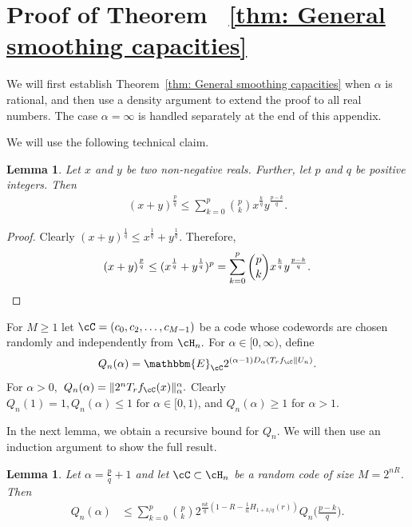 \documentclass{amsart}
\newtheorem{lemma}[theorem]{Lemma}
\theoremstyle{remark}
\begin{document}
\vspace*{.1in}\section{Proof of Theorem ~\ref{thm: General smoothing capacities}}\label{appendixB}

We will first establish Theorem~\ref{thm: General smoothing capacities} when  $\alpha$ is rational, and then use a density argument to extend the proof to all real numbers. The case $\alpha= \infty$ is handled separately at the end of this appendix.

We will use the following technical claim.

\begin{lemma}\label{lemma: frac binom.}
    Let $x$ and $y$ be two non-negative reals. Further, let $p$ and $q$ be positive integers. Then 
    \begin{align*}
        (x+y)^\frac{p}{q} \leq \sum_{k=0}^p\binom{p}{k}x^\frac{k}{q}y^\frac{p-k}{q}.
    \end{align*}
\end{lemma}
\begin{proof}
    Clearly $(x+y)^\frac{1}{q} \leq x^\frac{1}{q}+y^\frac{1}{q}$. Therefore,
    $$
        (x+y)^\frac{p}{q} \leq ( x^\frac{1}{q}+y^\frac{1}{q})^p= \sum_{k=0}^p\binom{p}{k}x^\frac{k}{q}y^\frac{p-k}{q}.\qedhere
    $$
\end{proof}
For $M\ge 1$ let $\cC = (c_0,c_2,\dots,c_{M-1})$ be a code whose codewords are chosen randomly and independently from $\cH_n.$ For $\alpha \in [0,\infty)$, define 
   \begin{equation}\label{eq:Q}
   Q_n(\alpha) = %
   \mathbbm{E}_{\cC}2^{(\alpha-1)D_{\alpha}(T_rf_\cC\|U_n)}.
   \end{equation} 
For $\alpha>0,$ $Q_n(\alpha)=\|2^nT_rf_\cC(x)\|^\alpha_\alpha.$ Clearly $Q_n(1) = 1, Q_n(\alpha) \leq 1 \text{ for } \alpha \in [0,1)$, and $Q_n(\alpha) \geq 1$
for $\alpha>1.$ 

In the next lemma, we obtain a recursive bound for $Q_n$. We will then use an induction argument to show the full result.

\begin{lemma}\label{lemma: recursive}
Let $\alpha = \frac{p}{q}+1$ and let $\cC\subset\cH_n$ be a random code of size $M=2^{nR}$. Then
\begin{align}
    Q_n(\alpha) & \leq \sum_{k=0}^p \binom{p}{k} 2^{\frac{nk}{q}(1-R-\frac1nH_{1+k/q}
    (r))}Q_n\Big(\frac{p-k}{q}\Big). \label{eq:Qn}
\end{align}
\end{lemma} 
\end{document}

